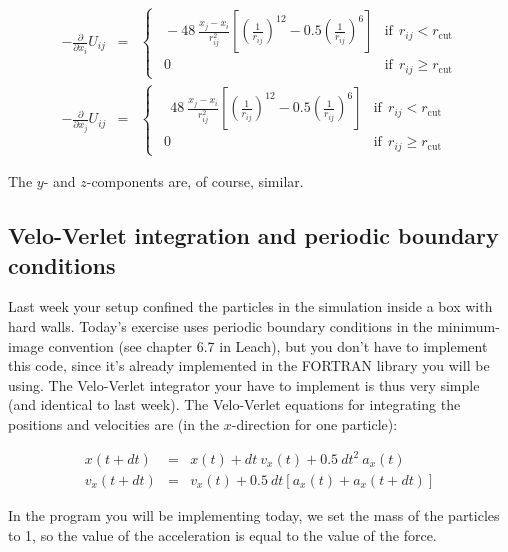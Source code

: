 \documentclass{article}
\begin{document}
\begin{eqnarray}
    -\frac{\partial}{\partial x_i} U_{ij}&=& 
    \begin{cases}
        \ \ -48\ \frac{x_j - x_i}{r^2_{ij}}
        \left[ \left(\frac{1}{r_{ij}} \right)^{12} - 0.5 \left(\frac{1}{r_{ij}} \right)^6 \right]
        & \mathrm{if}\ \ r_{ij} < r_{\mathrm{cut}} \\
        \ \ 0 & \mathrm{if}\ \ r_{ij} \ge  r_{\mathrm{cut}}
    \end{cases}\label{eq:force_i}\\
    -\frac{\partial}{\partial x_j} U_{ij}&=&
    \begin{cases}
        \ \ \ \ 48\ \frac{x_j - x_i}{r^2_{ij}}
        \left[ \left(\frac{1}{r_{ij}} \right)^{12} - 0.5 \left(\frac{1}{r_{ij}} \right)^6 \right]
        & \mathrm{if}\ \ r_{ij} < r_{\mathrm{cut}} \\
        \ \ 0 & \mathrm{if}\ \ r_{ij} \ge  r_{\mathrm{cut}}
    \end{cases}\label{eq:force_j}
\end{eqnarray}

The $y$- and $z$-components are, of course, similar.

\subsection{Velo-Verlet integration and periodic boundary conditions}

Last week your setup confined the particles in the simulation inside a box with
hard walls. Today's exercise uses periodic boundary conditions in the
minimum-image convention (see chapter 6.7 in Leach), but you don't have to
implement this code, since it's already implemented in the FORTRAN library you
will be using. The Velo-Verlet integrator your have to implement is thus very
simple (and identical to last week).
The Velo-Verlet equations for integrating the positions and velocities are (in
the $x$-direction for one particle):

\begin{eqnarray}
x(t + dt) &=& x(t) + dt\ v_x(t) + 0.5\ dt^2\ a_x(t)\label{eq:position_x}\\
v_x(t + dt) &=& v_x(t) + 0.5\ dt \left[a_x(t) + a_x(t+dt)\right]\label{eq:speed_x}
\end{eqnarray}

In the program you will be implementing today, we set the mass of the particles
to 1, so the value of the acceleration is equal to the value of the force.\\
\end{document}
